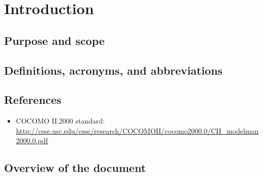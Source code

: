 \chapter{Introduction}\label{chap:introduction}


\section{Purpose and scope}
\lipsum[2]


\section{Definitions, acronyms, and abbreviations}
\lipsum[2]


\section{References}\label{sec:references}
\begin{itemize}
	\item COCOMO II.2000 standard: \url{http://csse.usc.edu/csse/research/COCOMOII/cocomo2000.0/CII_modelman2000.0.pdf}
\end{itemize}




\section{Overview of the document} 
\lipsum[2]





